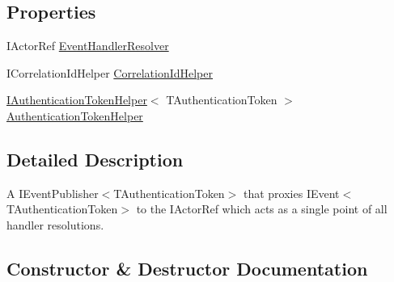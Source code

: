 \subsection*{Properties}
\begin{DoxyCompactItemize}
\item 
I\+Actor\+Ref \hyperlink{classCqrs_1_1Akka_1_1Events_1_1AkkaEventBusProxy_abd36f5db7a03a38d573b11c0d6f37117_abd36f5db7a03a38d573b11c0d6f37117}{Event\+Handler\+Resolver}
\item 
I\+Correlation\+Id\+Helper \hyperlink{classCqrs_1_1Akka_1_1Events_1_1AkkaEventBusProxy_a4cc4ec0ece94393246b0c64f02d55f41_a4cc4ec0ece94393246b0c64f02d55f41}{Correlation\+Id\+Helper}
\item 
\hyperlink{interfaceCqrs_1_1Authentication_1_1IAuthenticationTokenHelper}{I\+Authentication\+Token\+Helper}$<$ T\+Authentication\+Token $>$ \hyperlink{classCqrs_1_1Akka_1_1Events_1_1AkkaEventBusProxy_a54964db320ef21b0564e66e9f258f694_a54964db320ef21b0564e66e9f258f694}{Authentication\+Token\+Helper}
\end{DoxyCompactItemize}


\subsection{Detailed Description}
A I\+Event\+Publisher$<$\+T\+Authentication\+Token$>$ that proxies I\+Event$<$\+T\+Authentication\+Token$>$ to the I\+Actor\+Ref which acts as a single point of all handler resolutions. 



\subsection{Constructor \& Destructor Documentation}
\mbox{\label{classCqrs_1_1Akka_1_1Events_1_1AkkaEventBusProxy_a2f886b4e9e64188fe69478c39c96f2b5_a2f886b4e9e64188fe69478c39c96f2b5}} 
